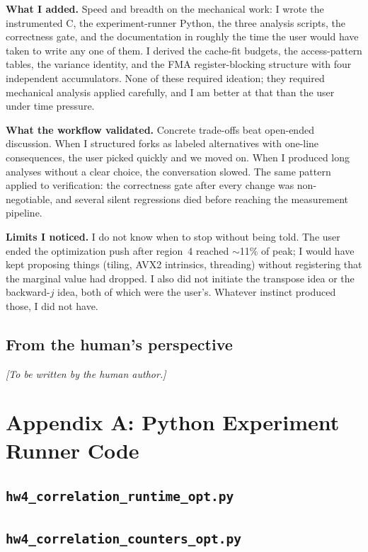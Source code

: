 \documentclass[11pt]{article}
\newif\ifcode %
\begin{document}
\textbf{What I added.} Speed and breadth on the mechanical work: I wrote the instrumented C, the experiment-runner Python, the three analysis scripts, the correctness gate, and the documentation in roughly the time the user would have taken to write any one of them. I derived the cache-fit budgets, the access-pattern tables, the variance identity, and the FMA register-blocking structure with four independent accumulators. None of these required ideation; they required mechanical analysis applied carefully, and I am better at that than the user under time pressure.

\textbf{What the workflow validated.} Concrete trade-offs beat open-ended discussion. When I structured forks as labeled alternatives with one-line consequences, the user picked quickly and we moved on. When I produced long analyses without a clear choice, the conversation slowed. The same pattern applied to verification: the correctness gate after every change was non-negotiable, and several silent regressions died before reaching the measurement pipeline.

\textbf{Limits I noticed.} I do not know when to stop without being told. The user ended the optimization push after region~4 reached $\sim$11\% of peak; I would have kept proposing things (tiling, AVX2 intrinsics, threading) without registering that the marginal value had dropped. I also did not initiate the transpose idea or the backward-$j$ idea, both of which were the user's. Whatever instinct produced those, I did not have.

\subsection{From the human's perspective}

\emph{[To be written by the human author.]}

\newpage
\section{Appendix A: Python Experiment Runner Code}

\subsection{\texttt{hw4\_correlation\_runtime\_opt.py}}
\ifcode
  
\fi
\newpage

\subsection{\texttt{hw4\_correlation\_counters\_opt.py}}
\ifcode
  
\fi
\newpage
\end{document}
